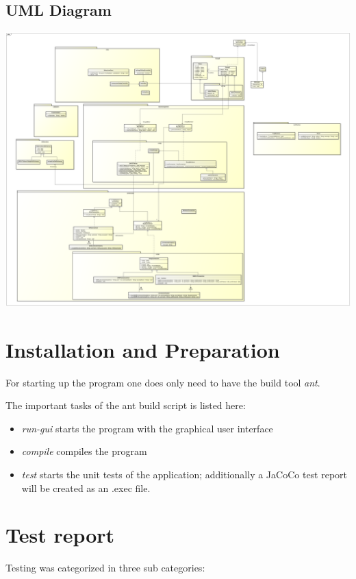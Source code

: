 \documentclass[11pt, a4paper]{article}
\begin{document}
\subsection{UML Diagram}
\includegraphics[width=\textwidth]{images/umlv3}

\newpage

\section{Installation and Preparation}

For starting up the program one does only need to have the build tool \textit{ant}. 

The important tasks of the ant build script is listed here:

\begin{itemize}
	\item \textit{run-gui} starts the program with the graphical user interface
	\item \textit{compile} compiles the program
	\item \textit{test} starts the unit tests of the application; additionally a JaCoCo test report will be created as an .exec file. 
\end{itemize}

\section{Test report}

Testing was categorized in three sub categories:
\end{document}
